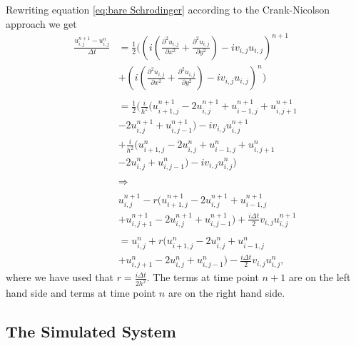 \documentclass[english,notitlepage,reprint,nofootinbib]{revtex4-2}  %
\begin{document}
	\noindent
	Rewriting equation \ref{eq:bare Schrodinger}
	according to the Crank-Nicolson approach we get 
	\begin{equation}\label{eq:algo}
		\begin{aligned}
		\frac{u^{n+1}_{i,j}-u^{n}_{i,j}}{\Delta t} &=  \frac{1}{2}\Big(\left(i\left(\frac{\partial^2 u_{i,j}}{\partial x^2} + \frac{\partial^2 u_{i,j}}{\partial y^2}\right) -i v_{i,j} u_{i,j}\right)^{n+1} \\
	    &+   \left(i(\frac{\partial^2 u_{i,j}}{\partial x^2} + \frac{\partial^2 u_{i,j}}{\partial y^2}) -i v_{i,j} u_{i,j}\right)^{n} \Big)\\
	    &\ \\
		&=  \frac{1}{2}\Big(    \frac{i}{h^2}\big(  u^{n+1}_{i+1,j}-2u^{n+1}_{i,j}+u^{n+1}_{i-1,j}   +u^{n+1}_{i,j+1}\\
		&-2u^{n+1}_{i,j}+u^{n+1}_{i,j-1}\big)-iv_{i,j}u^{n+1}_{i,j}\\
		&+ \frac{i}{h^2}\big(  u^{n}_{i+1,j}-2u^{n}_{i,j}+u^{n}_{i-1,j}   +u^{n}_{i,j+1}\\
		&-2u^{n}_{i,j}+u^{n}_{i,j-1}\big)-iv_{i,j}u^{n}_{i,j}      \Big)\\ 
		&\ \\
		&\Rightarrow \\ 
		&\ \\
		&u^{n+1}_{i,j} -r\Big(  u^{n+1}_{i+1,j}-2u^{n+1}_{i,j}+u^{n+1}_{i-1,j} \\
		&+u^{n+1}_{i,j+1}-2u^{n+1}_{i,j}+u^{n+1}_{i,j-1}\Big) +\frac{i\Delta t}{2}v_{i,j}u^{n+1}_{i,j}\\
		&\ \\
		&= u^n_{i,j}+ r\Big(  u^{n}_{i+1,j}-2u^{n}_{i,j}+u^{n}_{i-1,j}\\
		&+u^{n}_{i,j+1}-2u^{n}_{i,j}+u^{n}_{i,j-1}\Big)-\frac{i\Delta t}{2}v_{i,j}u^{n}_{i,j},
		\end{aligned}
	\end{equation}
	\noindent
	where we have used that $r = \frac{i\Delta t}{2h^2}$. The terms at time
	point $n+1$ are on the left hand side and terms at time point $n$ are on the right
	hand side.\\
	

	\subsection{The Simulated System}
\end{document}
